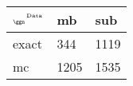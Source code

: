 \begin{tabular}{lll}
    \toprule
    $_{\text{\tiny{\ggn}}}$$^{\text{\tiny{Data}}}$ & mb & sub \\
    \midrule
    exact & 344
              & 1119 \\
    mc   & 1205
              & 1535 \\
    \bottomrule
\end{tabular}